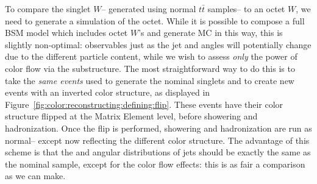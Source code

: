 To compare the singlet $W$-- generated using normal \PowPythia $t\bar{t}$ samples-- to an octet $W$, we need to generate a simulation of the octet. While it is possible to compose a full BSM model which includes octet $W$'s and generate MC in this way, this is slightly non-optimal: observables just as the jet \pt and angles will potentially change due to the different particle content, while we wish to assess \textit{only} the power of color flow via the substructure. The most straightforward way to do this is to take the \textit{same events} used to generate the nominal singlets and to create new events with an inverted color structure, as displayed in Figure~\ref{fig:color:reconstructing:defining:flip}. These events have their color structure flipped at the Matrix Element level, before showering and hadronization. Once the flip is performed, showering and hadronization are run as normal-- except now reflecting the different color structure. The advantage of this scheme is that the \pt and angular distributions of jets should be exactly the same as the nominal sample, except for the color flow effects: this is as fair a comparison as we can make.


